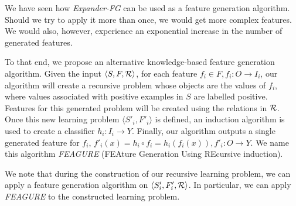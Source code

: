 \documentclass{article}
\theoremstyle{definition}
\begin{document}
We have seen how \emph{Expander-FG} can be used as a feature generation algorithm.
Should we try to apply it more than once, we would get more complex features. We would also, however, experience an exponential increase in the number of generated features.

To that end, we propose an alternative knowledge-based feature generation algorithm. Given the input $\langle S,F,{\cal R} \rangle$, for each feature $f_i\in F, f_i:O\rightarrow I_i$, our algorithm will create a recursive problem whose objects are the values of $f_i$, where values associated with positive examples in $S$ are labelled positive. %
Features for this generated problem will be created using the relations in ${\cal R}$. Once this new learning problem $\langle S'_i,F'_i\rangle$ is defined, an induction algorithm is used to create a classifier $h_i:I_i\rightarrow Y$. Finally, our algorithm outputs a single generated feature for $f_i$, $f'_i(x)=h_i\circ f_i=h_i(f_i(x)), f'_i:O\rightarrow Y$.
We name this algorithm \emph{FEAGURE} (FEAture Generation Using REcursive induction).

We note that during the construction of our recursive learning problem, we can apply a feature generation algorithm on $\langle S'_i,F'_i,{\cal R} \rangle$. In particular, we can apply \emph{FEAGURE} to the constructed learning problem.%

\end{document}
